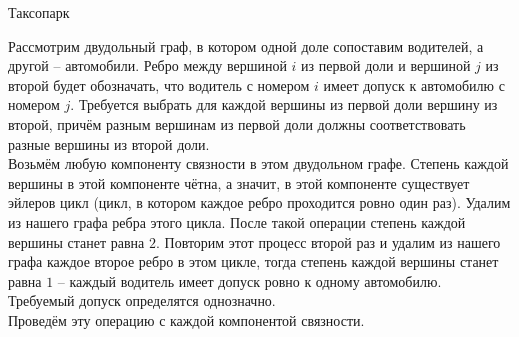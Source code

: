\begin{tutorial}{Таксопарк}

Рассмотрим двудольный граф, в котором одной доле сопоставим водителей, а другой -- автомобили. Ребро между вершиной $i$ из первой доли и вершиной $j$ из второй будет обозначать, что водитель с номером $i$ имеет допуск к автомобилю с номером $j$. Требуется выбрать для каждой вершины из первой доли вершину из второй, причём разным вершинам из первой доли должны соответствовать разные вершины из второй доли.\\
Возьмём любую компоненту связности в этом двудольном графе. Степень каждой вершины в этой компоненте чётна, а значит, в этой компоненте существует эйлеров цикл (цикл, в котором каждое ребро проходится ровно один раз). Удалим из нашего графа ребра этого цикла. После такой операции степень каждой вершины станет равна $2$. Повторим этот процесс второй раз и удалим из нашего графа каждое второе ребро в этом цикле, тогда степень каждой вершины станет равна $1$ -- каждый водитель имеет допуск ровно к одному автомобилю. Требуемый допуск определятся однозначно.\\
Проведём эту операцию с каждой компонентой связности.


\end{tutorial}
